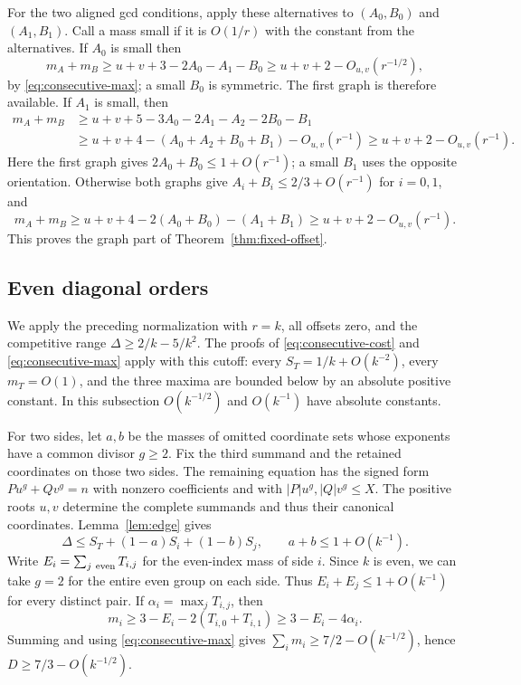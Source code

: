 \documentclass[11pt,reqno]{amsart}
\begin{document}
For the two aligned gcd conditions, apply these alternatives
to \((A_0,B_0)\) and \((A_1,B_1)\). Call a mass small if it
is \(O(1/r)\) with the constant from the alternatives. If \(A_0\)
is small then
\[
 m_A+m_B\ge u+v+3-2A_0-A_1-B_0\ge u+v+2-O_{u,v}(r^{-1/2}),
\]
by \eqref{eq:consecutive-max}; a small \(B_0\) is symmetric.
The first graph is therefore available. If \(A_1\) is small, then
\[
 \begin{aligned}
 m_A+m_B &\ge u+v+5-3A_0-2A_1-A_2-2B_0-B_1\\
         &\ge u+v+4-(A_0+A_2+B_0+B_1)-O_{u,v}(r^{-1})
          \ge u+v+2-O_{u,v}(r^{-1}).
 \end{aligned}
\]
Here the first graph gives \(2A_0+B_0\le1+O(r^{-1})\);
a small \(B_1\) uses the opposite orientation. Otherwise both
graphs give \(A_i+B_i\le2/3+O(r^{-1})\) for \(i=0,1\), and
\[
 m_A+m_B\ge u+v+4-2(A_0+B_0)-(A_1+B_1)
          \ge u+v+2-O_{u,v}(r^{-1}).
\]
This proves the graph part of Theorem~\ref{thm:fixed-offset}.

\subsection{Even diagonal orders}\label{sec:even-diagonal}

We apply the preceding normalization with \(r=k\), all offsets zero,
and the competitive range \(\Delta\ge2/k-5/k^2\). The proofs of
\eqref{eq:consecutive-cost} and \eqref{eq:consecutive-max} apply
with this cutoff: every \(S_T=1/k+O(k^{-2})\), every \(m_T=O(1)\),
and the three maxima are bounded below by an absolute positive constant.
In this subsection \(O(k^{-1/2})\) and \(O(k^{-1})\) have absolute
constants.

For two sides, let \(a,b\) be the masses of omitted coordinate
sets whose exponents have a common divisor \(g\ge2\). Fix the
third summand and the retained coordinates on those two sides.
The remaining equation has the signed form \(P u^g+Q v^g=n\)
with nonzero coefficients and with \(|P|u^g,|Q|v^g\le X\).
The positive roots \(u,v\) determine the complete summands
and thus their canonical coordinates. Lemma~\ref{lem:edge} gives
\[
 \Delta\le S_T+(1-a)S_i+(1-b)S_j,\qquad
 a+b\le1+O(k^{-1}).
\]
Write \(E_i=\sum_{j\ {\rm even}}T_{i,j}\) for the even-index
mass of side \(i\). Since \(k\) is even, we can take \(g=2\)
for the entire even group on each side. Thus
\(E_i+E_j\le1+O(k^{-1})\) for every distinct pair.
If \(\alpha_i=\max_j T_{i,j}\), then
\[
 m_i\ge 3-E_i-2(T_{i,0}+T_{i,1})
       \ge3-E_i-4\alpha_i .
\]
Summing and using \eqref{eq:consecutive-max} gives
\(\sum_i m_i\ge 7/2-O(k^{-1/2})\), hence \(D\ge 7/3-O(k^{-1/2})\).
\end{document}
